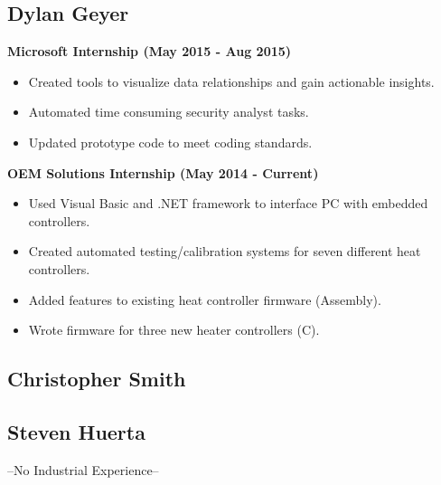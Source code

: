 % 

\subsection{Dylan Geyer}
\large{\textbf{Microsoft Internship (May 2015 - Aug 2015)}}
\begin{itemize}
	\item Created tools to visualize data relationships and gain actionable insights.
	\item Automated time consuming security analyst tasks.
	\item Updated prototype code to meet coding standards.
\end{itemize}
\large{\textbf{OEM Solutions Internship (May 2014 - Current)}}
\begin{itemize}
	\item Used Visual Basic and .NET framework to interface PC with embedded controllers.
	\item Created automated testing/calibration systems for seven different heat controllers.
	\item Added features to existing heat controller firmware (Assembly).
	\item Wrote firmware for three new heater controllers (C).
\end{itemize}
% 

\subsection{Christopher Smith}

% 

\subsection{Steven Huerta}
--No Industrial Experience--

